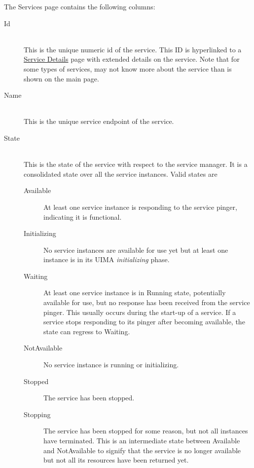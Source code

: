         The Services page contains the following columns: 
        \begin{description}

            \item[Id] \hfill \\
              This is the unique numeric {\DUCC} id of the service.  This ID is hyperlinked to a
              \hyperref[sec:ws-service-details]{Service Details} page with extended
              details on the service.  Note that for some types of services, {\DUCC} may not
              know more about the service than is shown on the main page.

            \item[Name] \hfill \\
              This is the unique service endpoint of the service.  
              
            \item[State] \hfill \\
              This is the state of the service with respect to the service manager.  It is a
              consolidated state over all the service instances.  Valid states are
              \begin{description}
                \item[Available] At least one service instance is responding to the service
                  pinger, indicating it is functional.
                \item[Initializing] No service instances are available for use yet but at least one instance
                  is in its UIMA {\em initializing} phase.
                \item[Waiting] At least one service instance is in Running state, potentially available for use,
                  but no response has been received from the service pinger.  This usually occurs during the
                  start-up of a service.  If a service stops responding to its pinger after becoming
                  available, the state can regress to Waiting.
                \item[NotAvailable] No service instance is running or initializing. 
                \item[Stopped] The service has been stopped.
                \item[Stopping] The service has been stopped for some reason, but not all 
                  instances have terminated.  This is an intermediate state between Available and
                  NotAvailable to signify that the service is no longer available but not all its
                  resources have been returned yet.
              \end{description}


\end{description}
